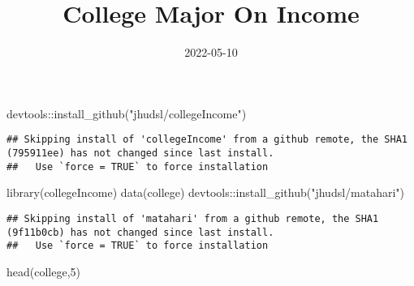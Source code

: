 \documentclass[
]{article}
\title{College Major On Income}
\author{}
\date{\vspace{-2.5em}2022-05-10}
\newenvironment{Shaded}{\begin{snugshade}}{\end{snugshade}}
\newcommand{\DecValTok}[1]{\textcolor[rgb]{0.00,0.00,0.81}{#1}}
\newcommand{\FunctionTok}[1]{\textcolor[rgb]{0.00,0.00,0.00}{#1}}
\newcommand{\NormalTok}[1]{#1}
\newcommand{\SpecialCharTok}[1]{\textcolor[rgb]{0.00,0.00,0.00}{#1}}
\newcommand{\StringTok}[1]{\textcolor[rgb]{0.31,0.60,0.02}{#1}}
\begin{document}
\maketitle

\begin{Shaded}
\begin{Highlighting}[]
\NormalTok{devtools}\SpecialCharTok{::}\FunctionTok{install\_github}\NormalTok{(}\StringTok{"jhudsl/collegeIncome"}\NormalTok{)}
\end{Highlighting}
\end{Shaded}

\begin{verbatim}
## Skipping install of 'collegeIncome' from a github remote, the SHA1 (795911ee) has not changed since last install.
##   Use `force = TRUE` to force installation
\end{verbatim}

\begin{Shaded}
\begin{Highlighting}[]
\FunctionTok{library}\NormalTok{(collegeIncome)}
\FunctionTok{data}\NormalTok{(college)}
\NormalTok{devtools}\SpecialCharTok{::}\FunctionTok{install\_github}\NormalTok{(}\StringTok{"jhudsl/matahari"}\NormalTok{)}
\end{Highlighting}
\end{Shaded}

\begin{verbatim}
## Skipping install of 'matahari' from a github remote, the SHA1 (9f11b0cb) has not changed since last install.
##   Use `force = TRUE` to force installation
\end{verbatim}

\begin{Shaded}
\begin{Highlighting}[]
\FunctionTok{head}\NormalTok{(college,}\DecValTok{5}\NormalTok{)}
\end{Highlighting}
\end{Shaded}
\end{document}
